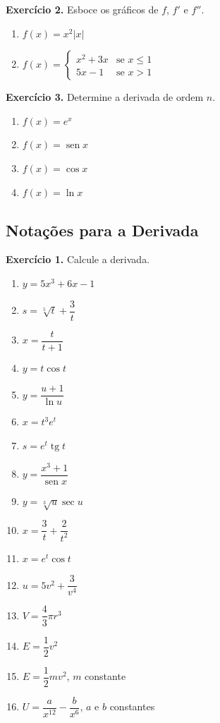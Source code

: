 \documentclass[12pt,a4paper]{article}
\begin{document}
\vspace{0.5cm}
\noindent\textbf{Exercício 2.} Esboce os gráficos de $f$, $f'$ e $f''$.
\begin{enumerate}
    \renewcommand{\theenumi}{\alph{enumi}}
    \renewcommand{\labelenumi}{\theenumi)}
    \item $f(x) = x^2 |x|$
    \item $f(x) = \begin{cases} x^2 + 3x & \text{se } x \le 1 \\ 5x - 1 & \text{se } x > 1 \end{cases}$
\end{enumerate}

\vspace{0.5cm}
\noindent\textbf{Exercício 3.} Determine a derivada de ordem $n$.
\begin{enumerate}
    \renewcommand{\theenumi}{\alph{enumi}}
    \renewcommand{\labelenumi}{\theenumi)}
    \item $f(x) = e^x$
    \item $f(x) = \operatorname{sen} x$
    \item $f(x) = \cos x$
    \item $f(x) = \ln x$
\end{enumerate}

\subsection{Notações para a Derivada}
\vspace{0.5cm}
\noindent\textbf{Exercício 1.} Calcule a derivada.
\begin{enumerate}
    \renewcommand{\theenumi}{\alph{enumi}}
    \renewcommand{\labelenumi}{\theenumi)}
    \item $y = 5x^3 + 6x - 1$
    \item $s = \sqrt[5]{t} + \dfrac{3}{t}$
    \item $x = \dfrac{t}{t + 1}$
    \item $y = t \cos t$
    \item $y = \dfrac{u + 1}{\ln u}$
    \item $x = t^3 e^t$
    \item $s = e^t \operatorname{tg} t$
    \item $y = \dfrac{x^3 + 1}{\operatorname{sen} x}$
    \item $y = \sqrt[3]{u} \sec u$
    \item $x = \dfrac{3}{t} + \dfrac{2}{t^2}$
    \item $x = e^t \cos t$
    \item $u = 5v^2 + \dfrac{3}{v^4}$
    \item $V = \dfrac{4}{3}\pi r^3$
    \item $E = \dfrac{1}{2}v^2$
    \item $E = \dfrac{1}{2}mv^2$, $m$ constante
    \item $U = \dfrac{a}{x^{12}} - \dfrac{b}{x^6}$, $a$ e $b$ constantes
\end{enumerate}
\end{document}
